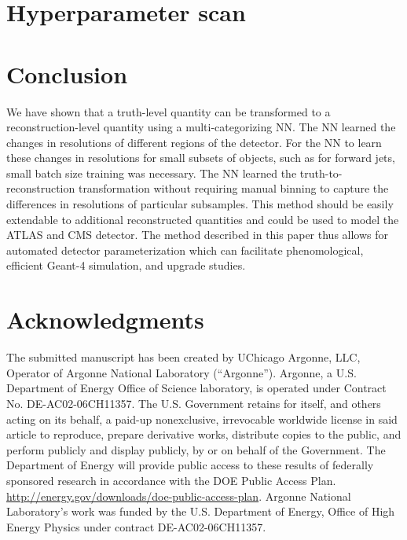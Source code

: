 \documentclass[showpacs,showkeys,preprint,prd,nofootinbib,linenumbers,12pt]{revtex4-1}
\begin{document}
\section{Hyperparameter scan}


\section{Conclusion}

We have shown that a truth-level quantity can be transformed to a reconstruction-level quantity using a multi-categorizing NN. The NN learned the changes in resolutions of different regions of the detector. For the NN to learn these changes in resolutions for small subsets of objects, such as for forward jets, small batch size training was necessary. The NN learned the truth-to-reconstruction transformation without requiring manual binning to capture the differences in resolutions of particular subsamples. This method should be easily extendable to additional reconstructed quantities and could be used to model the ATLAS and CMS detector. The method described in this paper thus allows for automated detector parameterization which can facilitate phenomological, efficient Geant-4 simulation, and upgrade studies. 

\section*{Acknowledgments}
The submitted manuscript has been created by UChicago Argonne, LLC, Operator of Argonne National Laboratory (“Argonne”). Argonne, a U.S.  Department of Energy Office of Science laboratory, is operated under Contract No. DE-AC02-06CH11357. The U.S. Government retains for itself, 
and others acting on its behalf, a paid-up nonexclusive, irrevocable worldwide license in said article to reproduce, prepare derivative works, distribute copies to the public, and perform publicly and display publicly, by or on behalf of the Government.  The Department of Energy will provide public access to these results of federally sponsored research in accordance with the 
DOE Public Access Plan. \url{http://energy.gov/downloads/doe-public-access-plan}. Argonne National Laboratory’s work was funded by the U.S. Department of Energy, Office of High Energy Physics under contract DE-AC02-06CH11357. 



\end{document}
